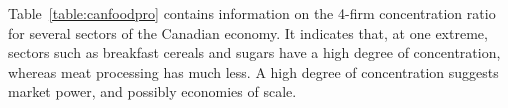 Table~\ref{table:canfoodpro} contains information on the 4-firm concentration ratio for several sectors of the Canadian economy. It indicates that, at one extreme, sectors such as breakfast cereals and sugars have a high degree of concentration, whereas meat processing has much less. A high degree of concentration suggests market power, and possibly economies of scale.